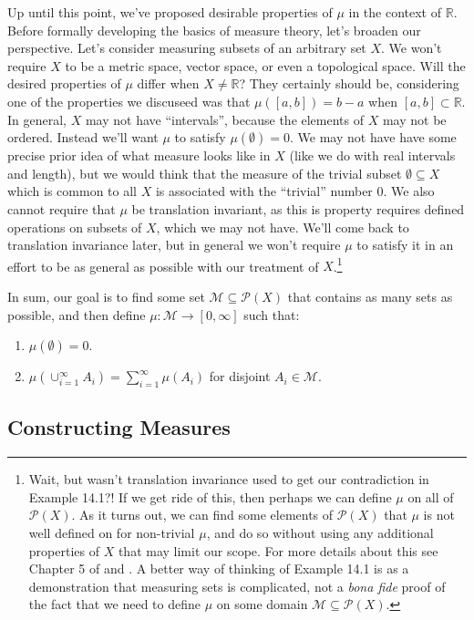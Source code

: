 \documentclass{article}
\newcommand{\R}{\mathbb{R}}
\theoremstyle{definition}
\begin{document}
Up until this point, we've proposed desirable properties of $\mu$ in the context of $\R$. Before formally developing the basics of measure theory, let's broaden our perspective. Let's consider measuring subsets of an arbitrary set $X$. We won't require $X$ to be a metric space, vector space, or even a topological space. Will the desired properties of $\mu$ differ when $X\neq \R$? They certainly should be, considering one of the properties we discuseed was that $\mu([a,b])=b-a$ when $[a,b]\subset \R$. In general, $X$ may not have ``intervals'', because the elements of $X$ may not be ordered. Instead we'll want $\mu$ to satisfy $\mu(\emptyset)=0$. We may not have have some precise prior idea of what measure looks like in $X$ (like we do with real intervals and length), but we would think that the measure of the trivial subset $\emptyset \subseteq X$ which is common to all $X$ is associated with the ``trivial'' number $0$.  We also cannot require that $\mu$ be translation invariant, as this is property requires defined operations on subsets of $X$, which we may not have. We'll come back to translation invariance later, but in general we won't require $\mu$ to satisfy it in an effort to be as general as possible with our treatment of $X$.\footnote{Wait, but wasn't translation invariance used to get our contradiction in Example 14.1?! If we get ride of this, then perhaps we can define $\mu$ on all of $\mathcal P(X)$. As it turns out, we can find some elements of $\mathcal P(X)$ that $\mu$ is not well defined on for non-trivial $\mu$, and do so without using any additional properties of $X$ that may limit our scope. For more details about this see Chapter 5 of \cite{oxtoby2013measure} and \cite{ulam1930masstheorie}. A better way of thinking of Example 14.1 is as a demonstration that measuring sets is complicated, not a \textit{bona fide} proof of the fact that we need to define $\mu$ on some domain $\mathcal M\subseteq \mathcal P(X)$.}

In sum, our goal is to find some set $\mathcal M\subseteq \mathcal P(X)$ that contains as many sets as possible, and then define $\mu :\mathcal M \to [0,\infty] $ such that:
\begin{enumerate}
	\item $\mu(\emptyset) = 0$.
	\item $\mu(\cup_{i=1}^\infty A_i) = \sum_{i=1}^{\infty}\mu(A_i)$ for disjoint $A_i\in \mathcal M$.
\end{enumerate}
\subsection{Constructing Measures}
\end{document}
